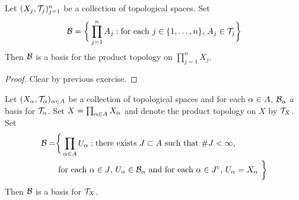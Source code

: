 \documentclass{book}
\begin{document}
	\begin{ex}  
		Let $(X_j, \mathcal{T}_j)_{j =1}^n$ be a collection of topological spaces. Set 
		$$\mathcal{B} = \bigg \{\prod\limits_{j=1}^n A_j: \text{for each $j \in \{1, \ldots, n\}$, } A_j \in \mathcal{T}_{j} \bigg \}$$ 
		Then $\mathcal{B}$ is a basis for the product topology on $\prod_{j=1}^n X_j$.
	\end{ex}

	\begin{proof}
		Clear by previous exercise.
	\end{proof}

	\begin{ex}  
		Let $(X_{\alpha}, \mathcal{T}_{\alpha})_{\alpha \in A}$ be a collection of topological spaces and for each $\alpha \in A$, $\mathcal{B}_{\alpha}$ a basis for $\mathcal{T}_{\alpha}$. Set $X = \prod_{\alpha \in A} X_{\alpha}$ and denote the product topology on $X$ by $\mathcal{T}_X$. Set 
		\begin{align*}
			\mathcal{B} = 
			& \bigg \{\prod_{\alpha \in A} U_{\alpha}: \text{there exists $J \subset A$ such that $ \# J < \infty$, } \\
			& \text{ for each $\alpha \in J$, $U_{\alpha} \in \mathcal{B}_{\alpha}$ and for each $\alpha \in J^c$, $U_{\alpha} = X_{\alpha}$ } \bigg \}
		\end{align*} 
		Then $\mathcal{B}$ is a basis for $\mathcal{T}_X$.
	\end{ex}
\end{document}
